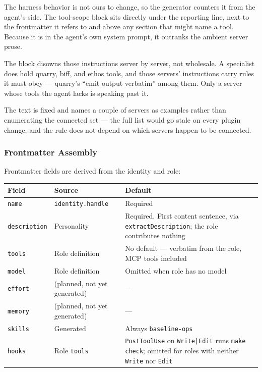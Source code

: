 \documentclass[a4paper,10pt]{article}
\newcommand{\field}[1]{\texttt{#1}}
\newcommand{\cmd}[1]{\texttt{#1}}
\begin{document}
The harness behavior is not ours to change, so the generator
counters it from the agent's side. The tool-scope block sits directly
under the reporting line, next to the frontmatter it refers to and
above any section that might name a tool. Because it is in the
agent's own system prompt, it outranks the ambient server prose.

The block disowns those instructions server by server, not wholesale.
A specialist does hold quarry, biff, and ethos tools, and those
servers' instructions carry rules it must obey --- quarry's ``emit
output verbatim'' among them. Only a server whose tools the agent
lacks is speaking past it.

The text is fixed and names a couple of servers as examples rather
than enumerating the connected set --- the full list would go stale
on every plugin change, and the rule does not depend on which servers
happen to be connected.

\subsubsection{Frontmatter Assembly}

Frontmatter fields are derived from the identity and role:

\begin{center}
\begin{tabularx}{\textwidth}{@{}llX@{}}
\toprule
\textbf{Field} & \textbf{Source} & \textbf{Default} \\
\midrule
\field{name} & \field{identity.handle} & Required \\
\field{description} & Personality & Required. First content sentence,
  via \cmd{extractDescription}; the role contributes nothing \\
\field{tools} & Role definition & No default --- verbatim from the
  role, MCP tools included \\
\field{model} & Role definition & Omitted when role has no model \\
\field{effort} & (planned, not yet generated) & --- \\
\field{memory} & (planned, not yet generated) & --- \\
\field{skills} & Generated & Always \field{baseline-ops} \\
\field{hooks} & Role \field{tools} & \field{PostToolUse} on
  \texttt{Write|Edit} runs \cmd{make check}; omitted for roles with
  neither \field{Write} nor \field{Edit} \\
\bottomrule
\end{tabularx}
\end{center}
\end{document}
